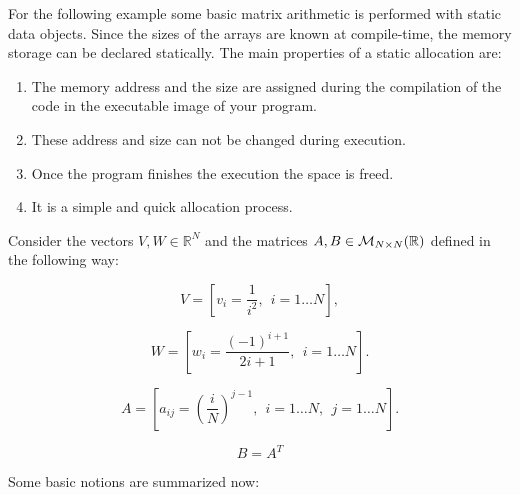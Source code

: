 For the following example some basic matrix arithmetic is performed with static data objects. 
Since the sizes of the arrays are known at compile-time, the memory storage can be declared statically. 
The main properties of a static allocation are:

\begin{enumerate}
    \item The memory address and the size are assigned during the compilation of the code in the executable image of your program.
    \item These address and size can not be changed during execution.
    \item Once the program finishes the execution the space is freed.
    \item It is a simple and quick allocation process.
\end{enumerate}


Consider the vectors $V, W \in \mathbb{R}^N$ and the matrices  $ A, B \in { \cal{M}}_{N \times N} (\mathbb{R})$ defined in the following way: 

$$
V = \left[ v_i =\frac{1}{i^2}, \ \ i = 1 \ldots  N \right],
$$

$$
W = \left[ w_i = \frac{(-1)^{i+1}}{2i+1}, \ \ i = 1 \ldots  N \right].
$$

$$
A = \left[ a_{ij} = \left( \frac{i}{N} \right)^{j-1}, \ \ i = 1 \ldots  N, \ \ j = 1 \ldots  N \right].
$$

$$
B = A^T
$$






Some basic notions are summarized now: 

